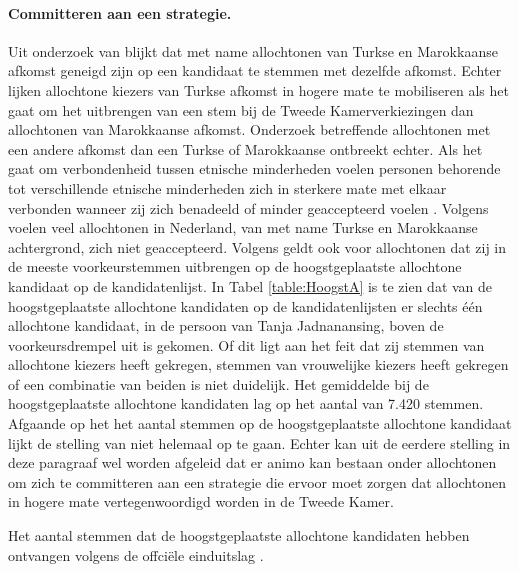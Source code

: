 \paragraph{Committeren aan een strategie.}
Uit onderzoek van \cite{fennema2001civic} blijkt dat met name allochtonen van Turkse en Marokkaanse afkomst geneigd zijn op een kandidaat te stemmen met dezelfde afkomst. Echter lijken allochtone kiezers van Turkse afkomst in hogere mate te mobiliseren als het gaat om het uitbrengen van een stem bij de Tweede Kamerverkiezingen dan allochtonen van Marokkaanse afkomst. Onderzoek betreffende allochtonen met een andere afkomst dan een Turkse of Marokkaanse ontbreekt echter. Als het gaat om verbondenheid tussen etnische minderheden voelen personen behorende tot verschillende etnische minderheden zich in sterkere mate met elkaar verbonden wanneer zij zich benadeeld of minder geaccepteerd voelen \citep{schmitt2002meaning}. Volgens \cite{buijs2006strijders} voelen veel allochtonen in Nederland, van met name Turkse en Marokkaanse achtergrond, zich niet geaccepteerd. Volgens \cite{van2012tweede} geldt ook voor allochtonen dat zij in de meeste voorkeurstemmen uitbrengen op de hoogstgeplaatste allochtone kandidaat op de kandidatenlijst. In Tabel \ref{table:HoogstA} is te zien dat van de hoogstgeplaatste allochtone kandidaten op de kandidatenlijsten er slechts één allochtone kandidaat, in de persoon van Tanja Jadnanansing, boven de voorkeursdrempel uit is gekomen. Of dit ligt aan het feit dat zij stemmen van allochtone kiezers heeft gekregen, stemmen van vrouwelijke kiezers heeft gekregen of een combinatie van beiden is niet duidelijk. Het gemiddelde bij de hoogstgeplaatste allochtone kandidaten lag op het aantal van 7.420 stemmen. Afgaande op het het aantal stemmen op de hoogstgeplaatste allochtone kandidaat lijkt de stelling van \cite{van2012tweede} niet helemaal op te gaan. Echter kan uit de eerdere stelling in deze paragraaf wel worden afgeleid dat er animo kan bestaan onder allochtonen om zich te committeren aan een strategie die ervoor moet zorgen dat allochtonen in hogere mate vertegenwoordigd worden in de Tweede Kamer. \\

\begin{table}[H]
\centering
	\begin{footnotesize}
		
	\end{footnotesize}
			\caption{Het aantal stemmen dat de hoogstgeplaatste allochtone kandidaten hebben ontvangen volgens de offci\"{e}le einduitslag \citep{Kiesraad_uitslag}.}
\label{table:HoogstA} 
\end{table}





